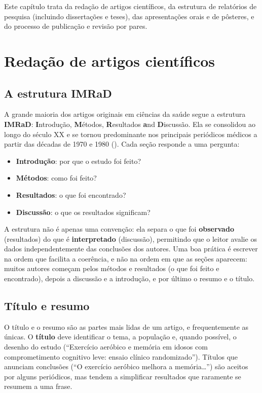 \documentclass[
]{book}
\providecommand{\tightlist}{%
  \setlength{\itemsep}{0pt}\setlength{\parskip}{0pt}}
\begin{document}
Este capítulo trata da redação de artigos científicos, da estrutura de relatórios de pesquisa (incluindo dissertações e teses), das apresentações orais e de pôsteres, e do processo de publicação e revisão por pares.

\section{Redação de artigos científicos}\label{redauxe7uxe3o-de-artigos-cientuxedficos}

\subsection{A estrutura IMRaD}\label{a-estrutura-imrad}

A grande maioria dos artigos originais em ciências da saúde segue a estrutura \textbf{IMRaD}: \textbf{I}ntrodução, \textbf{M}étodos, \textbf{R}esultados \textbf{a}nd \textbf{D}iscussão. Ela se consolidou ao longo do século XX e se tornou predominante nos principais periódicos médicos a partir das décadas de 1970 e 1980 (). Cada seção responde a uma pergunta:

\begin{itemize}
\tightlist
\item
  \textbf{Introdução}: por que o estudo foi feito?
\item
  \textbf{Métodos}: como foi feito?
\item
  \textbf{Resultados}: o que foi encontrado?
\item
  \textbf{Discussão}: o que os resultados significam?
\end{itemize}

A estrutura não é apenas uma convenção: ela separa o que foi \textbf{observado} (resultados) do que é \textbf{interpretado} (discussão), permitindo que o leitor avalie os dados independentemente das conclusões dos autores. Uma boa prática é escrever na ordem que facilita a coerência, e não na ordem em que as seções aparecem: muitos autores começam pelos métodos e resultados (o que foi feito e encontrado), depois a discussão e a introdução, e por último o resumo e o título.

\subsection{Título e resumo}\label{tuxedtulo-e-resumo}

O título e o resumo são as partes mais lidas de um artigo, e frequentemente as únicas. O \textbf{título} deve identificar o tema, a população e, quando possível, o desenho do estudo (``Exercício aeróbico e memória em idosos com comprometimento cognitivo leve: ensaio clínico randomizado''). Títulos que anunciam conclusões (``O exercício aeróbico melhora a memória\ldots{}'') são aceitos por alguns periódicos, mas tendem a simplificar resultados que raramente se resumem a uma frase.
\end{document}
